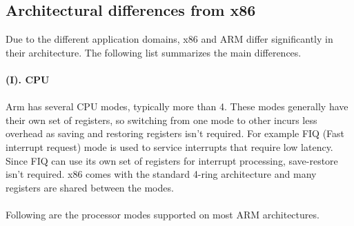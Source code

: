\documentclass[seminar,twoside]{iitbreport}
\begin{document}
\subsection{Architectural differences from x86}
\label{archdiff2}
Due to the different application domains, x86 and ARM differ significantly in their architecture. The following list summarizes the main differences.
\\\\
\textbf{(I). CPU}
\\\\
Arm has several CPU modes, typically more than 4. These modes generally have their own set of registers, so switching from one mode to other incurs less overhead as saving and restoring registers isn't required. For example FIQ (Fast interrupt request) mode is used to service interrupts that require low latency. Since FIQ can use its own set of registers for interrupt processing, save-restore isn't required.
x86 comes with the standard 4-ring architecture and many registers are shared between the modes.
\\\\Following are the processor modes supported on most ARM architectures.\\
\end{document}
